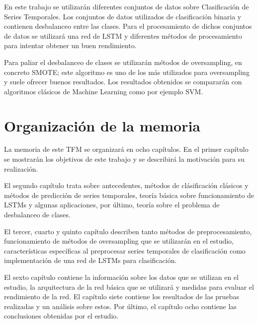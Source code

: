 En este trabajo se utilizarán diferentes conjuntos de datos sobre Clasificación de Series Temporales. Los conjuntos de datos utilizados de clasificación binaria y contienen desbalanceo entre las clases. Para el procesamiento de dichos conjuntos de datos se utilizará una red de LSTM y diferentes métodos de procesamiento para intentar obtener un buen rendimiento.\newline

Para paliar el desbalanceo de clases se utilizarán métodos de oversampling, en concreto SMOTE; este algoritmo es uno de los más utilizados para oversampling y suele ofrecer buenos resultados. Los resultados obtenidos se compararán con algoritmos clásicos de Machine Learning como por ejemplo SVM.
\newpage

\section{Organización de la memoria}
La memoria de este TFM se organizará en ocho capítulos. En el primer capítulo se mostrarán los objetivos de este trabajo y se describirá la motivación para su realización.\newline

El segundo capítulo trata sobre antecedentes, métodos de clásificación clásicos y métodos de predicción de series temporales, teoría básica sobre funcionamiento de LSTMs y algunas aplicaciones, por último, teoría sobre el problema de desbalanceo de clases.\newline

El tercer, cuarto y quinto capítulo describen tanto métodos de preprocesamiento, funcionamiento de métodos de oversampling que se utilizarán en el estudio, características específicas al preprocesar series temporales de clasificación  como implementación de una red de LSTMs para clasificación.\newline

El sexto capítulo contiene la información sobre los datos que se utilizan en el estudio, la arquitectura de la red básica que se utilizará y medidas para evaluar el rendimiento de la red. El capítulo siete contiene los resultados de las pruebas realizadas y un análisis sobre estos. Por último, el capítulo ocho contiene las conclusiones obtenidas por el estudio.